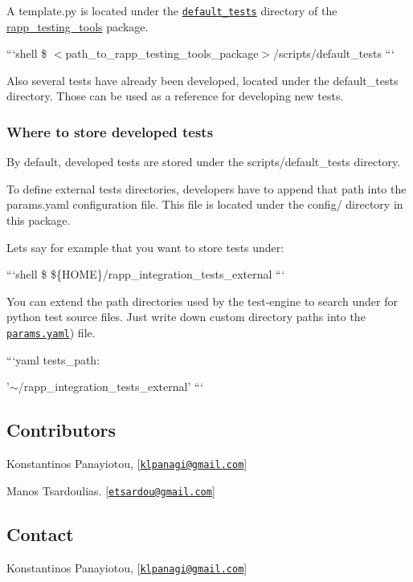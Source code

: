 A template.\-py is located under the \href{https://github.com/rapp-project/rapp-platform/tree/master/rapp_testing_tools/scripts/default_tests}{\tt default\-\_\-tests} directory of the \hyperlink{namespacerapp__testing__tools}{rapp\-\_\-testing\-\_\-tools} package.

```shell \$ $<$path\-\_\-to\-\_\-rapp\-\_\-testing\-\_\-tools\-\_\-package$>$/scripts/default\-\_\-tests ```

Also several tests have already been developed, located under the default\-\_\-tests directory. Those can be used as a reference for developing new tests.

\subsubsection*{Where to store developed tests}

By default, developed tests are stored under the scripts/default\-\_\-tests directory.

To define external tests directories, developers have to append that path into the params.\-yaml configuration file. This file is located under the config/ directory in this package.

Lets say for example that you want to store tests under\-:

```shell \$ \$\{H\-O\-M\-E\}/rapp\-\_\-integration\-\_\-tests\-\_\-external ```

You can extend the path directories used by the test-\/engine to search under for python test source files. Just write down custom directory paths into the \href{[params.yaml](https://github.com/rapp-project/rapp-platform/blob/master/rapp_testing_tools/config/params.yaml}{\tt params.\-yaml}) file.

```yaml tests\-\_\-path\-:
\begin{DoxyItemize}
\item '$\sim$/rapp\-\_\-integration\-\_\-tests\-\_\-external' ```
\end{DoxyItemize}

\subsection*{Contributors}


\begin{DoxyItemize}
\item Konstantinos Panayiotou, \mbox{[}\href{mailto:klpanagi@gmail.com}{\tt klpanagi@gmail.\-com}\mbox{]}
\item Manos Tsardoulias. \mbox{[}\href{mailto:etsardou@gmail.com}{\tt etsardou@gmail.\-com}\mbox{]}
\end{DoxyItemize}

\subsection*{Contact}


\begin{DoxyItemize}
\item Konstantinos Panayiotou, \mbox{[}\href{mailto:klpanagi@gmail.com}{\tt klpanagi@gmail.\-com}\mbox{]} 
\end{DoxyItemize}